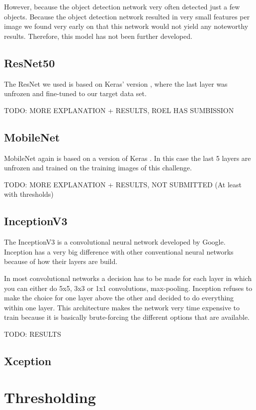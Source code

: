 \documentclass[10pt, a4paper]{article}
\begin{document}
\begin{multicols}{2}
		However, because the object detection network very often detected just a few objects. Because the object detection network resulted in very small features per image we found very early on that this network would not yield any noteworthy results. Therefore, this model has not been further developed.
		
		\subsection{ResNet50}
		The ResNet we used is based on Keras' version \cite{DBLP:journals/corr/HeZRS15}, where the last layer was unfrozen and fine-tuned to our target data set. 
		
		TODO: MORE EXPLANATION + RESULTS, ROEL HAS SUMBISSION
		
		\subsection{MobileNet}
		MobileNet again is based on a version of Keras \cite{howard2017mobilenets}. In this case the last 5 layers are unfrozen and trained on the training images of this challenge.
		
		TODO: MORE EXPLANATION + RESULTS, NOT SUBMITTED (At least with thresholds)
		
		\subsection{InceptionV3}
		The InceptionV3 \cite{DBLP:journals/corr/SzegedyVISW15} is a convolutional neural network developed by Google. Inception has a very big difference with other conventional neural networks because of how their layers are build.
		
		In most convolutional networks a decision has to be made for each layer in which you can either do 5x5, 3x3 or 1x1 convolutions, max-pooling. Inception refuses to make the choice for one layer above the other and decided to do everything within one layer. This architecture makes the network very time expensive to train because it is basically brute-forcing the different options that are available.
		
		TODO: RESULTS
		
		\subsection{Xception}
		
		
		\section{Thresholding}
		

\end{multicols}
\end{document}
